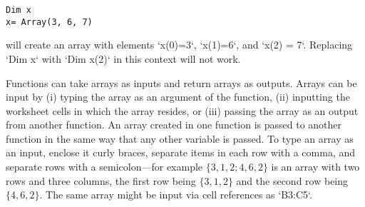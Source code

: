 \small\begin{verbatim}
Dim x
x= Array(3, 6, 7)
\end{verbatim}\normalsize
will create an array with elements `x(0)=3`, `x(1)=6`, and `x(2) = 7`.
Replacing `Dim x` with `Dim x(2)` in this context will not work.

Functions can take arrays as inputs and return arrays as outputs. Arrays
can be input by (i) typing the array as an argument of the function,
(ii) inputting the worksheet cells in which the array resides, or (iii)
passing the array as an output from another function. An array created
in one function is passed to another function in the same way that any
other variable is passed. To type an array as an input, enclose it curly
braces, separate items in each row with a comma, and separate rows with
a semicolon---for example $\{3,1,2; 4,6,2\}$ is an array with two rows
and three columns, the first row being $\{3,1,2\}$ and the second row
being $\{4,6,2\}$. The same array might be input via cell references as
`B3:C5`.

